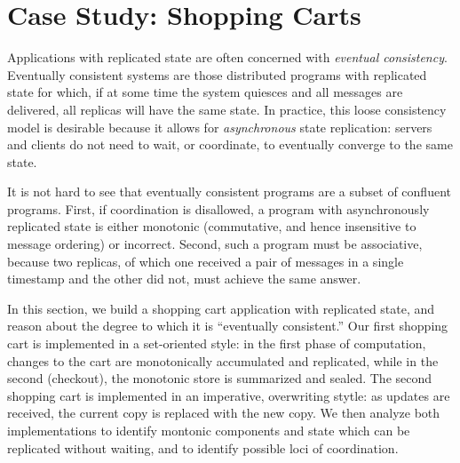 \section{Case Study: Shopping Carts}
Applications with replicated state are often concerned with {\em eventual
consistency}.  
Eventually consistent systems are those distributed programs with replicated state for which,
if at some time the system quiesces and all 
messages are delivered, all replicas will have the same state.
In practice, this loose consistency model is desirable because it allows for \emph{asynchronous}
state replication: servers and clients do not
need to wait, or coordinate, to eventually converge to the same state.

%

It is not hard to see that eventually consistent programs are a subset of
confluent programs.  First, if coordination is disallowed, 
a program with asynchronously replicated state is either monotonic (commutative, and hence
insensitive to message ordering)
or incorrect.  Second, such a program must be
associative, because two replicas, of which one received a pair of messages in
a single timestamp and the other did not, must achieve the same answer.

In this section, we build a shopping cart application with replicated state,
and reason about the degree to which it is ``eventually consistent.''  Our first 
shopping cart is implemented in a set-oriented style: in the first phase of computation,
changes to the cart are monotonically accumulated and replicated, while in the second
(checkout), the monotonic store is summarized and sealed.  The second shopping cart
is implemented in an imperative, overwriting stytle: as updates are received, the current copy 
is replaced with the new copy.  We then analyze both implementations to identify montonic 
components and state which can be replicated without waiting, and to identify possible
loci of coordination.




